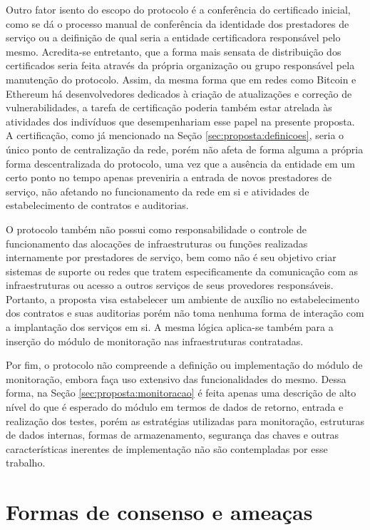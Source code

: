 Outro fator isento do escopo do protocolo é a conferência do certificado inicial, como se dá o processo manual de conferência da identidade dos prestadores de serviço ou a deifinição de qual seria a entidade certificadora responsável pelo mesmo. Acredita-se entretanto, que a forma mais sensata de distribuição dos certificados seria feita através da própria organização ou grupo responsável pela manutenção do protocolo. Assim, da mesma forma que em redes como Bitcoin e Ethereum há desenvolvedores dedicados à criação de atualizações e correção de vulnerabilidades, a tarefa de certificação poderia também estar atrelada às atividades dos indivíduos que desempenhariam esse papel na presente proposta. A certificação, como já mencionado na Seção \ref{sec:proposta:definicoes}, seria o único ponto de centralização da rede, porém não afeta de forma alguma a própria forma descentralizada do protocolo, uma vez que a ausência da entidade em um certo ponto no tempo apenas preveniria a entrada de novos prestadores de serviço, não afetando no funcionamento da rede em si e atividades de estabelecimento de contratos e auditorias.

O protocolo também não possui como responsabilidade o controle de funcionamento das alocações de infraestruturas ou funções realizadas internamente por prestadores de serviço, bem como não é seu objetivo criar sistemas de suporte ou redes que tratem especificamente da comunicação com as infraestruturas ou acesso a outros serviços de seus provedores responsáveis. Portanto, a proposta visa estabelecer um ambiente de auxílio no estabelecimento dos contratos e suas auditorias porém não toma nenhuma forma de interação com a implantação dos serviços em si. A mesma lógica aplica-se também para a inserção do módulo de monitoração nas infraestruturas contratadas. 

Por fim, o protocolo não compreende a definição ou implementação do módulo de monitoração, embora faça uso extensivo das funcionalidades do mesmo. Dessa forma, na Seção \ref{sec:proposta:monitoracao} é feita apenas uma descrição de alto nível do que é esperado do módulo em termos de dados de retorno, entrada e realização dos testes, porém as estratégias utilizadas para monitoração, estruturas de dados internas, formas de armazenamento, segurança das chaves e outras características inerentes de implementação não são contempladas por esse trabalho. 

\section{Formas de consenso e ameaças}
\label{sec:ameacas_consenso}

